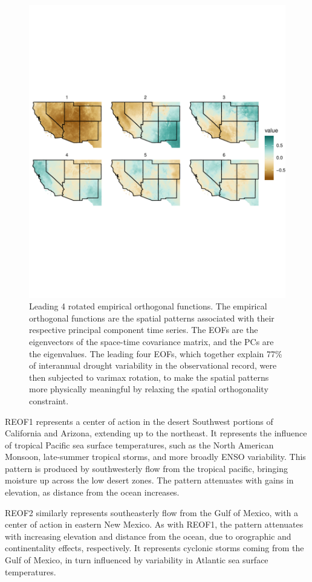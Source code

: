 \documentclass[fleqn,10pt]{wlscirep}
\begin{document}
\begin{figure}[ht]
\centering
\includegraphics[width=.8\linewidth]{figures/eof_observed.pdf}
\caption{Leading 4 rotated empirical orthogonal functions. The empirical orthogonal functions are the spatial patterns associated with their respective principal component time series. The EOFs are the eigenvectors of the space-time covariance matrix, and the PCs are the eigenvalues. The leading four EOFs, which together explain 77\% of interannual drought variability in the observational record, were then subjected to varimax rotation, to make the spatial patterns more physically meaningful by relaxing the spatial orthogonality constraint.}
\label{fig:reofs}
\end{figure}

REOF1 represents a center of action in the desert Southwest portions of California and Arizona, extending up to the northeast. It represents the influence of tropical Pacific sea surface temperatures, such as the North American Monsoon, late-summer tropical storms, and more broadly ENSO variability. This pattern is produced by southwesterly flow from the tropical pacific, bringing moisture up across the low desert zones. The pattern attenuates with gains in elevation, as distance from the ocean increases. 

REOF2 similarly represents southeasterly flow from the Gulf of Mexico, with a center of action in eastern New Mexico. As with REOF1, the pattern attenuates with increasing elevation and distance from the ocean, due to orographic and continentality effects, respectively. It represents cyclonic storms coming from the Gulf of Mexico, in turn influenced by variability in Atlantic sea surface temperatures. 
\end{document}
